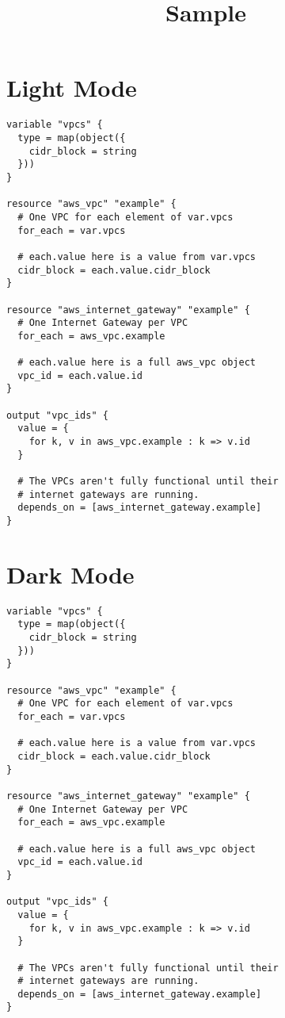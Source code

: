 \documentclass[dvipdfmx,uplatex,a4paper]{article}
\title{Sample}
\begin{document}
\maketitle

\section*{Light Mode}
\begin{lstlisting}[language=HCL,style=light]
variable "vpcs" {
  type = map(object({
    cidr_block = string
  }))
}

resource "aws_vpc" "example" {
  # One VPC for each element of var.vpcs
  for_each = var.vpcs

  # each.value here is a value from var.vpcs
  cidr_block = each.value.cidr_block
}

resource "aws_internet_gateway" "example" {
  # One Internet Gateway per VPC
  for_each = aws_vpc.example

  # each.value here is a full aws_vpc object
  vpc_id = each.value.id
}

output "vpc_ids" {
  value = {
    for k, v in aws_vpc.example : k => v.id
  }

  # The VPCs aren't fully functional until their
  # internet gateways are running.
  depends_on = [aws_internet_gateway.example]
}
\end{lstlisting}

\section*{Dark Mode}
\begin{lstlisting}[language=HCL,style=dark]
variable "vpcs" {
  type = map(object({
    cidr_block = string
  }))
}

resource "aws_vpc" "example" {
  # One VPC for each element of var.vpcs
  for_each = var.vpcs

  # each.value here is a value from var.vpcs
  cidr_block = each.value.cidr_block
}

resource "aws_internet_gateway" "example" {
  # One Internet Gateway per VPC
  for_each = aws_vpc.example

  # each.value here is a full aws_vpc object
  vpc_id = each.value.id
}

output "vpc_ids" {
  value = {
    for k, v in aws_vpc.example : k => v.id
  }

  # The VPCs aren't fully functional until their
  # internet gateways are running.
  depends_on = [aws_internet_gateway.example]
}
\end{lstlisting}
\end{document}
